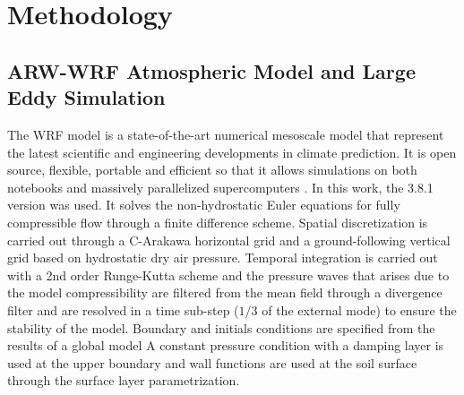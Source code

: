 \section{Methodology}
\subsection{ARW-WRF Atmospheric Model and Large Eddy Simulation}
The WRF model is a state-of-the-art numerical mesoscale model that represent the latest scientific and engineering developments in climate prediction. It is open source, flexible, portable and efficient so that it allows simulations on both notebooks and massively parallelized supercomputers \citep{https://doi.org/10.5065/d68s4mvh}. In this work, the 3.8.1 version was used. It solves the non-hydrostatic Euler equations for fully compressible flow through a finite difference scheme. Spatial discretization is carried out through a C-Arakawa horizontal grid and a ground-following vertical grid based on hydrostatic dry air pressure. Temporal integration is carried out with a 2nd order Runge-Kutta scheme and the pressure waves that arises due to the model compressibility are filtered from the mean field through a divergence filter and are resolved in a time sub-step ($1/3$ of the external mode) to ensure the stability of the model. Boundary and initials conditions are specified from the results of a global model  A constant pressure condition with a damping layer is used at the upper boundary and wall functions are used at the soil surface through the surface layer parametrization.


